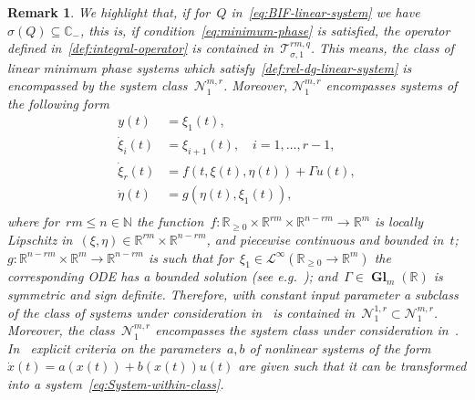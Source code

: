 \documentclass[ envcountsect, envcountsame]{svjour3}
\newtheorem{Remark}[Theorem]{Remark}
\newcommand{\R}{\mathbb{R}}
\newcommand{\C}{\mathbb{C}}
\newcommand{\N}{\mathbb{N}}
\newcommand{\cL}{\mathcal{L}}
\newcommand{\cN}{\mathcal{N}}
\newcommand{\cT}{\mathcal{T}}
\newcommand{\rp}{\mathbb{R}_{\geq 0}}
\DeclareMathOperator{\Gl}{\mathbf{Gl}}
\def\red#1{\textcolor[rgb]{0.60,0.10,0.07}{#1}}
\begin{document}
%
\begin{Remark} \label{Rem:linear-min-phase-satisfy-a-prime}
We highlight that, if for~$Q$ in~\eqref{eq:BIF-linear-system} we have~$\sigma(Q) \subseteq \C_-$, this is, if condition~\eqref{eq:minimum-phase} is satisfied, the operator defined in~\eqref{def:integral-operator} is contained in~$\cT^{rm,q}_{\sigma,1}$.
This means, the class of linear minimum phase systems which satisfy~\eqref{def:rel-dg-linear-system} is encompassed by the system class~$ \cN^{m,r}_1$.
%
Moreover, $\cN^{m,r}_1$ encompasses systems of the following form
\begin{equation} \label{eq:System-within-class}
\begin{aligned}
y(t) &= \xi_1(t), \\
\dot \xi_i(t) &= \xi_{i+1}(t), \quad i=1,\ldots,r-1, \\
\dot \xi_r(t) &= f(t,\xi(t),\eta(t)) + \Gamma u(t), \\
\dot \eta(t) &= g(\eta(t),\xi_1(t)), \\
\end{aligned}
\end{equation}
where for~$rm \le n \in \N$ the function~$f: \rp \times \R^{rm} \times \R^{n-rm} \to \R^{m}$ is locally Lipschitz in~$(\xi,\eta) \in \R^{rm} \times \R^{n-rm}$, and piecewise continuous and bounded in~$t$; 
${g: \R^{n-rm} \times \R^{m} \to \R^{n-rm}}$ is such that for~$\xi_1 \in \cL^{\infty}(\rp \to \R^m)$ the corresponding ODE has a bounded solution (see e.g.~\cite[Thm. 4.3]{Lanz21}); and~$\Gamma \in \Gl_m(\R)$ is symmetric and sign definite.
%
Therefore, with constant input parameter a subclass of the class of systems under consideration in~\cite{ChowKhal19} is contained in~$ \cN^{1,r}_1 \subset  \cN^{m,r}_1$.
Moreover, the class~$\cN^{m,r}_1$ encompasses the system class under consideration in~\cite{IlchRyan07}.
In~\cite[Cor.~5.7]{ByrnIsid91a} explicit criteria on the parameters~$a,b$ of nonlinear systems of the form $\dot x(t) = a(x(t)) + b(x(t)) u(t)$ are given such that it can be transformed into a system~\eqref{eq:System-within-class}.
\end{Remark}
\end{document}
